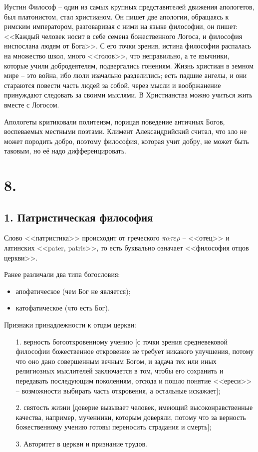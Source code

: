 \documentclass[a4paper, 12pt]{book} %
\begin{document}
Иустин Философ -- один из самых крупных представителей движения апологетов, был платонистом, стал христианом. Он пишет две апологии, обращаясь к римским императором, разговаривая с ними на языке философии, он пишет: <<Каждый человек носит в себе семена божественного Логоса, и философия ниспослана людям от Бога>>. С его точки зрения, истина философии распалась на множество школ, много <<голов>>, что неправильно, а те язычники, которые учили добродеятелям, подвергались гонениям. Жизнь христиан в земном мире -- это война, ибо люли изачально разделились; есть падшие ангелы, и они стараются повести часть людей за собой, через мысли и вообржанение принуждают следовать за своими мыслями. В Христианства можно учиться жить вместе с Логосом. 

Апологеты критиковали политеизм, порицая поведение античных Богов, воспеваемых местными поэтами. Климент Александрийский считал, что зло не может породить добро, поэтому философия, которая учит добру, не может быть таковым, но её надо дифференцировать.

\section*{8.}

\subsection*{1. Патристическая философия}
Слово <<патристика>> происходит от греческого $\pi \alpha \tau \varepsilon \rho$ -- <<отец>> и латинских <<pater, patris>>, то есть буквально означает <<философия отцов церкви>>.

Ранее различали два типа богословия:
\begin{itemize}
\item апофатическое (чем Бог не является);
\item катофатическое (что есть Бог).
\end{itemize}

Признаки принадлежности к отцам церкви:
\begin{itemize}
\item[1.] верность богооткровенному учению [с точки зрения средневековой философии божественное откровение не требует никакого улучшения, потому что оно дано совершенным вечным Богом, и задача тех или иных религиозных мыслителей заключается в том, чтобы его сохранить и передавать последующим поколениям, отсюда и пошло понятие <<ереси>> -- возможности выбирать часть откровения, а остальные искажает];
\item[2.] святость жизни [доверие вызывает человек, имеющий высоконравственные качества, например, мученники, которым доверяли, потому что за верность божественному учению готовы переносить страдания и смерть];
\item[3.] Авторитет в церкви и признание трудов.
\end{itemize}  
\end{document}
